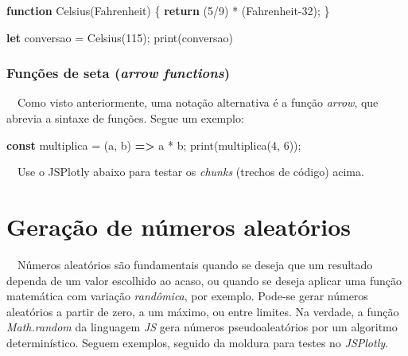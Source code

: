 \documentclass[
  portuguese,
  letterpaper,
  DIV=11,
  numbers=noendperiod]{scrreprt}
\newenvironment{Shaded}{\begin{snugshade}}{\end{snugshade}}
\newcommand{\ControlFlowTok}[1]{\textcolor[rgb]{0.00,0.23,0.31}{\textbf{#1}}}
\newcommand{\DecValTok}[1]{\textcolor[rgb]{0.68,0.00,0.00}{#1}}
\newcommand{\FunctionTok}[1]{\textcolor[rgb]{0.28,0.35,0.67}{#1}}
\newcommand{\KeywordTok}[1]{\textcolor[rgb]{0.00,0.23,0.31}{\textbf{#1}}}
\newcommand{\NormalTok}[1]{\textcolor[rgb]{0.00,0.23,0.31}{#1}}
\newcommand{\OperatorTok}[1]{\textcolor[rgb]{0.37,0.37,0.37}{#1}}
\begin{document}
\hfill\break

\begin{Shaded}
\begin{Highlighting}[]
\KeywordTok{function} \FunctionTok{Celsius}\NormalTok{(Fahrenheit) \{}
  \ControlFlowTok{return}\NormalTok{ (}\DecValTok{5}\OperatorTok{/}\DecValTok{9}\NormalTok{) }\OperatorTok{*}\NormalTok{ (Fahrenheit}\OperatorTok{{-}}\DecValTok{32}\NormalTok{)}\OperatorTok{;}
\NormalTok{\}}

\KeywordTok{let}\NormalTok{ conversao }\OperatorTok{=} \FunctionTok{Celsius}\NormalTok{(}\DecValTok{115}\NormalTok{)}\OperatorTok{;}
\FunctionTok{print}\NormalTok{(conversao)}
\end{Highlighting}
\end{Shaded}

\hfill\break

\subsubsection{\texorpdfstring{Funções de seta (\emph{arrow
functions})}{Funções de seta (arrow functions)}}\label{funuxe7uxf5es-de-seta-arrow-functions}

~~Como visto anteriormente, uma notação alternativa é a função
\emph{arrow}, que abrevia a sintaxe de funções. Segue um exemplo:

\begin{Shaded}
\begin{Highlighting}[]
\KeywordTok{const}\NormalTok{ multiplica }\OperatorTok{=}\NormalTok{ (a}\OperatorTok{,}\NormalTok{ b) }\KeywordTok{=\textgreater{}}\NormalTok{ a }\OperatorTok{*}\NormalTok{ b}\OperatorTok{;}
\FunctionTok{print}\NormalTok{(}\FunctionTok{multiplica}\NormalTok{(}\DecValTok{4}\OperatorTok{,} \DecValTok{6}\NormalTok{))}\OperatorTok{;}
\end{Highlighting}
\end{Shaded}

~~Use o JSPlotly abaixo para testar os \emph{chunks} (trechos de código)
acima.

\hfill\break

\section{Geração de números
aleatórios}\label{gerauxe7uxe3o-de-nuxfameros-aleatuxf3rios}

~~Números aleatórios são fundamentais quando se deseja que um resultado
dependa de um valor escolhido ao acaso, ou quando se deseja aplicar uma
função matemática com variação \emph{randômica}, por exemplo. Pode-se
gerar números aleatórios a partir de zero, a um máximo, ou entre
limites. Na verdade, a função \emph{Math.random} da linguagem \emph{JS}
gera números pseudoaleatórios por um algoritmo determinístico. Seguem
exemplos, seguido da moldura para testes no \emph{JSPlotly}.
\end{document}
